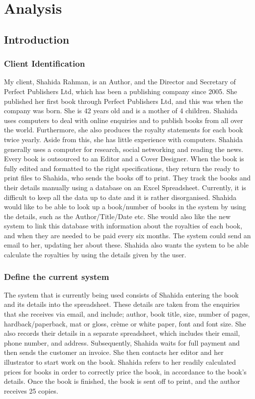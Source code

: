 \chapter{Analysis}

\section{Introduction}

\subsection{Client Identification}
My client, Shahida Rahman, is an Author, and the Director and Secretary of Perfect Publishers Ltd, which has been a publishing company since 2005. She published her first book through Perfect Publishers Ltd, and this was when the company was born. She is 42 years old and is a mother of 4 children. Shahida uses computers to deal with online enquiries and to publish books from all over the world. Furthermore, she also produces the royalty statements for each book twice yearly. Aside from this, she has little experience with computers. Shahida generally uses a computer for research, social networking and reading the news. Every book is outsourced to an Editor and a Cover Designer. When the book is fully edited and formatted to the right specifications, they return the ready to print files to Shahida, who sends the books off to print. They track the books and their details manually using a database on an Excel Spreadsheet. Currently, it is difficult to keep all the data up to date and it is rather disorganised. Shahida would like to be able to look up a book/number of books in the system by using the details, such as the Author/Title/Date etc. She would also like the new system to link this database with information about the royalties of each book, and when they are needed to be paid every six months. The system could send an email to her, updating her about these. Shahida also wants the system to be able calculate the royalties by using the details given by the user.

\subsection{Define the current system}
The system that is currently being used consists of Shahida entering the book and its details into the spreadsheet. These details are taken from the enquiries that she receives via email, and include; author, book title, size, number of pages, hardback/paperback, mat or gloss, crème or white paper, font and font size. She also records their details in a separate spreadsheet, which includes their email, phone number, and address. Subsequently, Shahida waits for full payment and then sends the customer an invoice. She then contacts her editor and her illustrator to start work on the book. Shahida refers to her readily calculated prices for books in order to correctly price the book, in accordance to the book’s details. Once the book is finished, the book is sent off to print, and the author receives 25 copies.

